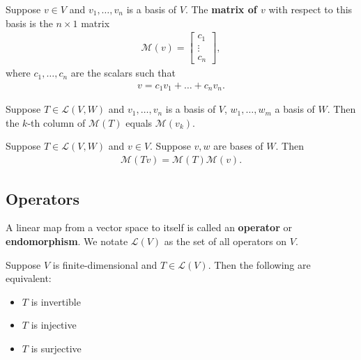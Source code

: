 \documentclass{memoir}
\begin{document}
\begin{defn}
	Suppose $v \in V$ and $v_1,\ldots,v_n$ is a basis of $V$. The \textbf{matrix of $v$} with respect to this basis is the $n\times 1$ matrix
	\begin{align*}
		\mathcal{M}(v) = \begin{bmatrix} c_1 \\ \vdots \\ c_n \end{bmatrix} ,
	\end{align*}
	where $c_1,\ldots,c_n$ are the scalars such that
	\begin{align*}
		v = c_1v_1 + \ldots + c_nv_n .
	\end{align*}
\end{defn}
\begin{cor}
	Suppose $T \in \mathcal{L}(V,W)$ and $v_1,\ldots,v_n$ is a basis of $V$, $w_1,\ldots,w_m$ a basis of $W$. Then the $ k$-th column of $\mathcal{M}(T)$ equals $\mathcal{M}(v_k)$.
\end{cor}

\begin{lemma}
	Suppose $T \in \mathcal{L}(V,W)$ and $v \in V$. Suppose $v,w$ are bases of $W$. Then
	\begin{align*}
		\mathcal{M}(Tv) = \mathcal{M}(T) \mathcal{M}(v) .
	\end{align*}
\end{lemma}
\subsection{Operators}
\label{sec:operators}

\begin{defn}[Operators]
	A linear map from a vector space to itself is called an \textbf{operator} or \textbf{endomorphism}. We notate $\mathcal{L}(V)$ as the set of all operators on $V$.	
\end{defn}
\begin{thm}
	Suppose $V$ is finite-dimensional and $T \in \mathcal{L}(V)$. Then the following are equivalent:
	\begin{itemize}
		\item $T$ is invertible
		\item $T$ is injective
		\item $T$ is surjective
	\end{itemize}
\end{thm}
\end{document}
